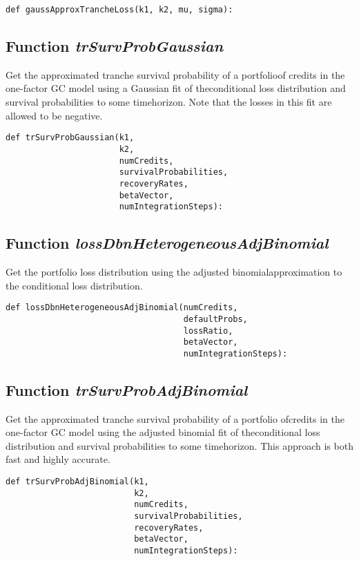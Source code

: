 \documentclass[twoside,11pt]{book}
\begin{document}
\begin{lstlisting}
def gaussApproxTrancheLoss(k1, k2, mu, sigma):
\end{lstlisting}

\subsection{Function {\it trSurvProbGaussian}}
Get the approximated tranche survival probability of a portfolioof credits in the one-factor GC model using a Gaussian fit of theconditional loss distribution and survival probabilities to some timehorizon. Note that the losses in this fit are allowed to be negative. 

\begin{lstlisting}
def trSurvProbGaussian(k1,
                       k2,
                       numCredits,
                       survivalProbabilities,
                       recoveryRates,
                       betaVector,
                       numIntegrationSteps):
\end{lstlisting}

\subsection{Function {\it lossDbnHeterogeneousAdjBinomial}}
Get the portfolio loss distribution using the adjusted binomialapproximation to the conditional loss distribution. 

\begin{lstlisting}
def lossDbnHeterogeneousAdjBinomial(numCredits,
                                    defaultProbs,
                                    lossRatio,
                                    betaVector,
                                    numIntegrationSteps):
\end{lstlisting}

\subsection{Function {\it trSurvProbAdjBinomial}}
Get the approximated tranche survival probability of a portfolio ofcredits in the one-factor GC model using the adjusted binomial fit of theconditional loss distribution and survival probabilities to some timehorizon. This approach is both fast and highly accurate. 

\begin{lstlisting}
def trSurvProbAdjBinomial(k1,
                          k2,
                          numCredits,
                          survivalProbabilities,
                          recoveryRates,
                          betaVector,
                          numIntegrationSteps):
\end{lstlisting}
\end{document}
